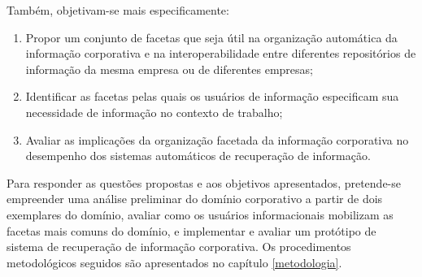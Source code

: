 
Também, objetivam-se mais especificamente:

\begin{enumerate}
	\item Propor um conjunto de facetas que seja útil na organização automática da informação corporativa e na interoperabilidade entre diferentes repositórios de informação da mesma empresa ou de diferentes empresas;

	\item Identificar as facetas pelas quais os usuários de informação especificam sua necessidade de informação no contexto de trabalho;

	\item Avaliar as implicações da organização facetada da informação corporativa no desempenho dos sistemas automáticos de recuperação de informação.

\end{enumerate}

Para responder as questões propostas e aos objetivos apresentados, pretende-se empreender uma análise preliminar do domínio corporativo a partir de dois exemplares do domínio, avaliar como os usuários informacionais mobilizam as facetas mais comuns do domínio, e implementar e avaliar um protótipo de sistema de recuperação de informação corporativa. Os procedimentos metodológicos seguidos são apresentados no capítulo \ref{metodologia}.















